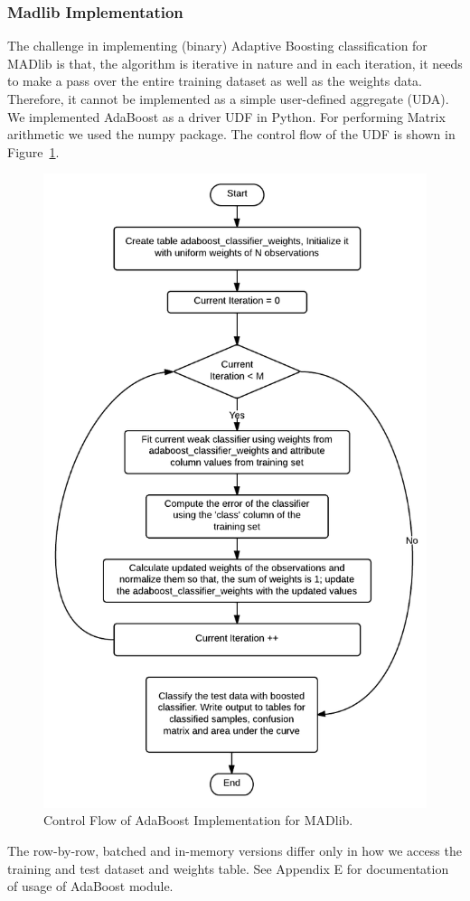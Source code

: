 \subsubsection{Madlib Implementation}
The challenge in implementing (binary) Adaptive Boosting classification for MADlib is that, the algorithm is iterative in nature and in each iteration, it needs to make a pass over the entire training dataset as well as the weights data. Therefore, it cannot be implemented as a simple user-defined aggregate (UDA). We implemented AdaBoost as a driver UDF in Python. For performing Matrix arithmetic we used the {\ttfamily numpy} package. The control flow of the UDF is shown in Figure~\ref{fig:adaimp}.

\begin{figure}[h]
\centering
\includegraphics[scale=0.5]{adaimp.png}
\caption{Control Flow of AdaBoost Implementation for MADlib.}
\label{fig:adaimp}
\end{figure}

The row-by-row, batched and in-memory versions differ only in how we access the training and test dataset and weights table. See Appendix E for documentation of usage of AdaBoost module.



